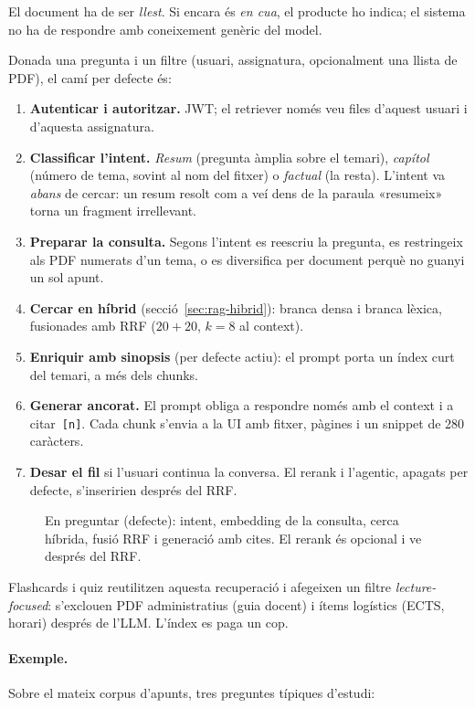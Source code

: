 El document ha de ser \emph{llest}. Si encara és \emph{en cua}, el producte ho indica; el sistema no ha de respondre amb coneixement genèric del model.

Donada una pregunta i un filtre (usuari, assignatura, opcionalment una llista de PDF), el camí per defecte és:

\begin{enumerate}
  \item \textbf{Autenticar i autoritzar.} JWT; el retriever només veu files d'aquest usuari i d'aquesta assignatura.
  \item \textbf{Classificar l'intent.} \emph{Resum} (pregunta àmplia sobre el temari), \emph{capítol} (número de tema, sovint al nom del fitxer) o \emph{factual} (la resta). L'intent va \emph{abans} de cercar: un resum resolt com a veí dens de la paraula «resumeix» torna un fragment irrellevant.
  \item \textbf{Preparar la consulta.} Segons l'intent es reescriu la pregunta, es restringeix als PDF numerats d'un tema, o es diversifica per document perquè no guanyi un sol apunt.
  \item \textbf{Cercar en híbrid} (secció~\ref{sec:rag-hibrid}): branca densa i branca lèxica, fusionades amb RRF ($20+20$, $k=8$ al context).
  \item \textbf{Enriquir amb sinopsis} (per defecte actiu): el prompt porta un índex curt del temari, a més dels chunks.
  \item \textbf{Generar ancorat.} El prompt obliga a respondre només amb el context i a citar~\texttt{[n]}. Cada chunk s'envia a la UI amb fitxer, pàgines i un snippet de 280 caràcters.
  \item \textbf{Desar el fil} si l'usuari continua la conversa. El rerank i l'agentic, apagats per defecte, s'inseririen després del RRF.
\end{enumerate}

\begin{figure}[htbp]
\centering

\caption{En preguntar (defecte): intent, embedding de la consulta, cerca híbrida, fusió RRF i generació amb cites. El rerank és opcional i ve després del RRF.}
\label{fig:retrieval}
\end{figure}

Flashcards i quiz reutilitzen aquesta recuperació i afegeixen un filtre \emph{lecture-focused}: s'exclouen PDF administratius (guia docent) i ítems logístics (ECTS, horari) després de l'LLM. L'índex es paga un cop.

\paragraph{Exemple.}
Sobre el mateix corpus d'apunts, tres preguntes típiques d'estudi:

